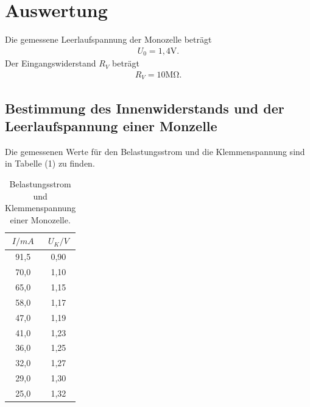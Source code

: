 \section{Auswertung}
\label{sec:Auswertung}

Die gemessene Leerlaufspannung der Monozelle beträgt
\begin{align*}
U_0 = 1,4 \si{\volt} .
\end{align*}
\noindent Der Eingangswiderstand $R_V$ beträgt 
\begin{align*}
R_V = 10 \si{\mega\ohm} .
\end{align*}

\subsection{Bestimmung des Innenwiderstands und der Leerlaufspannung einer Monzelle}
Die gemessenen Werte für den Belastungsstrom und die Klemmenspannung sind in Tabelle (1) zu finden.

\begin{table}[H]
  \centering
  \caption{Belastungsstrom und Klemmenspannung einer Monozelle.}
  \begin{tabular}{c c}
    \toprule
     $I/mA$ & $U_K/V$  \\
    \midrule
    91,5 & 0,90\\
    70,0 & 1,10\\
    65,0 & 1,15\\
    58,0 & 1,17\\
    47,0 & 1,19\\
    41,0 & 1,23\\
    36,0 & 1,25\\
    32,0 & 1,27\\
    29,0 & 1,30\\
    25,0 & 1,32\\
  \bottomrule
  \end{tabular}
\end{table}

